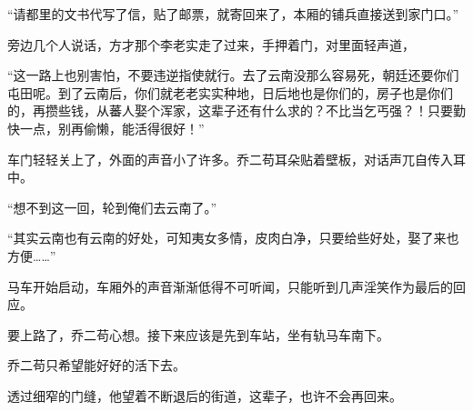 “请都里的文书代写了信，贴了邮票，就寄回来了，本厢的铺兵直接送到家门口。”

旁边几个人说话，方才那个李老实走了过来，手押着门，对里面轻声道，

“这一路上也别害怕，不要违逆指使就行。去了云南没那么容易死，朝廷还要你们屯田呢。到了云南后，你们就老老实实种地，日后地也是你们的，房子也是你们的，再攒些钱，从蕃人娶个浑家，这辈子还有什么求的？不比当乞丐强？！只要勤快一点，别再偷懒，能活得很好！”

车门轻轻关上了，外面的声音小了许多。乔二苟耳朵贴着壁板，对话声兀自传入耳中。

“想不到这一回，轮到俺们去云南了。”

“其实云南也有云南的好处，可知夷女多情，皮肉白净，只要给些好处，娶了来也方便……”

马车开始启动，车厢外的声音渐渐低得不可听闻，只能听到几声淫笑作为最后的回应。

要上路了，乔二苟心想。接下来应该是先到车站，坐有轨马车南下。

乔二苟只希望能好好的活下去。

透过细窄的门缝，他望着不断退后的街道，这辈子，也许不会再回来。
